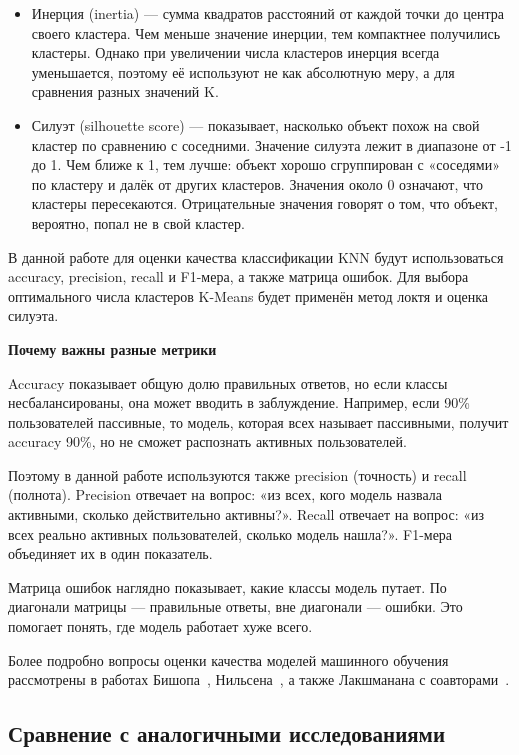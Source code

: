 \documentclass[14pt, a4paper]{extarticle}
\begin{document}
\begin{itemize}
    \item Инерция (inertia) — сумма квадратов расстояний от каждой точки до центра своего кластера. Чем меньше значение инерции, тем компактнее получились кластеры. Однако при увеличении числа кластеров инерция всегда уменьшается, поэтому её используют не как абсолютную меру, а для сравнения разных значений K.
    
    \item Силуэт (silhouette score) — показывает, насколько объект похож на свой кластер по сравнению с соседними. Значение силуэта лежит в диапазоне от -1 до 1. Чем ближе к 1, тем лучше: объект хорошо сгруппирован с «соседями» по кластеру и далёк от других кластеров. Значения около 0 означают, что кластеры пересекаются. Отрицательные значения говорят о том, что объект, вероятно, попал не в свой кластер.
\end{itemize}


В данной работе для оценки качества классификации KNN будут использоваться accuracy, precision, recall и F1-мера, а также матрица ошибок. Для выбора оптимального числа кластеров K-Means будет применён метод локтя и оценка силуэта.

\textbf{Почему важны разные метрики}

Accuracy показывает общую долю правильных ответов, но если классы несбалансированы, она может вводить в заблуждение. Например, если 90\% пользователей пассивные, то модель, которая всех называет пассивными, получит accuracy 90\%, но не сможет распознать активных пользователей.

Поэтому в данной работе используются также precision (точность) и recall (полнота). Precision отвечает на вопрос: «из всех, кого модель назвала активными, сколько действительно активны?». Recall отвечает на вопрос: «из всех реально активных пользователей, сколько модель нашла?». F1-мера объединяет их в один показатель.

Матрица ошибок наглядно показывает, какие классы модель путает. По диагонали матрицы — правильные ответы, вне диагонали — ошибки. Это помогает понять, где модель работает хуже всего.

Более подробно вопросы оценки качества моделей машинного обучения рассмотрены в работах Бишопа~\cite{bishop}, Нильсена~\cite{nielsen}, а также Лакшманана с соавторами~\cite{lakshmanan}.
\newpage
\subsection{Сравнение с аналогичными исследованиями}
\end{document}
